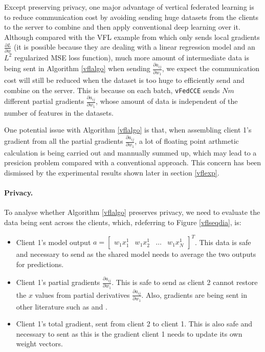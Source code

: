 \documentclass{article}
\begin{document}
Except preserving privacy, one major advantage of vertical federated learning is to reduce communication cost by avoiding sending huge datasets from the clients to the server to combine and then apply conventional deep learning over it. Although compared with the VFL example from \cite{yang2019federated} which only sends local gradients $\frac{\partial L}{\partial w}$ (it is possible because they are dealing with a linear regression model and an $L^2$ regularized MSE loss function), much more amount of intermediate data is being sent in Algorithm \ref{vflalgo} when sending $\frac{\partial a_{ij}}{\partial w_1}$, we expect the communication cost will still be reduced when the dataset is too huge to efficiently send and combine on the server. This is because on each batch, \texttt{vFedCCE} sends $Nm$ different partial gradients $\frac{\partial a_{ij}}{\partial w_1}$, whose amount of data is independent of the number of features in the datasets.

One potential issue with Algorithm \ref{vflalgo} is that, when assembling client 1's gradient from all the partial gradients $\frac{\partial a_{ij}}{\partial w_1}$, a lot of floating point arthmetic calculation is being carried out and mannually summed up, which may lead to a presicion problem compared with a conventional approach. This concern has been dismissed by the experimental results shown later in section \ref{vflexp}.

\paragraph{Privacy.} To analyse whether Algorithm \ref{vflalgo} preserves privacy, we need to evaluate the data being sent across the clients, which, rdeferring to Figure \ref{vflseqdia}, is:
\begin{itemize}
  \item Client 1's model output $a=\begin{bmatrix} w_1x_1^1& w_1x_2^1& \ldots &w_1x_N^1 \end{bmatrix}^T$. This data is safe and necessary to send as the shared model needs to average the two outputs for predictions.
  \item Client 1's partial gradients $\frac{\partial a_{ij}}{\partial w_1}$. This is safe to send as client 2 cannot restore the $x$ values from partial derivatives $\frac{\partial a_{ij}}{\partial w_1}$. Also, gradients are being sent in other literature such as \cite{yang2019federated} and \cite{hardy2017private}.
  \item Client 1's total gradient, sent from client 2 to client 1. This is also safe and necessary to sent as this is the gradient client 1 needs to update its own weight vectors.
\end{itemize}
\end{document}
